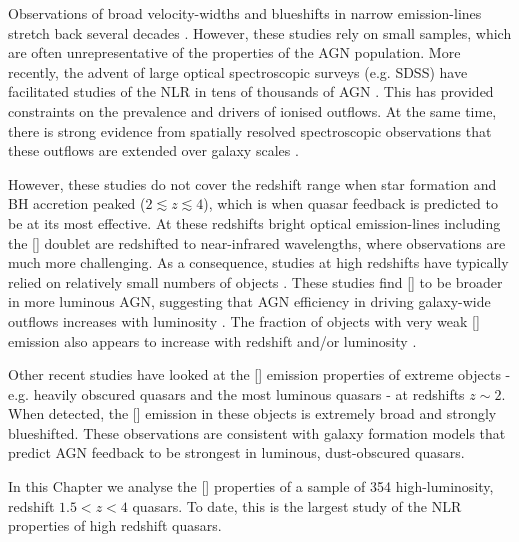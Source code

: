 Observations of broad velocity-widths and blueshifts in narrow emission-lines stretch back several decades \citep[e.g.][]{weedman70,stockton76,heckman81,veron81,feldman82,heckman84,vrtilek85,whittle85,boroson92}. 
However, these studies rely on small samples, which are often unrepresentative of the properties of the AGN population. 
More recently, the advent of large optical spectroscopic surveys (e.g. SDSS) have facilitated studies of the NLR in tens of thousands of AGN \citep[e.g.][]{boroson05,greene05a,zhang11,mullaney13,zakamska14,shen14}. 
This has provided constraints on the prevalence and drivers of ionised outflows.   
At the same time, there is strong evidence from spatially resolved spectroscopic observations that these outflows are extended over galaxy scales \citep[e.g.][]{greene09,greene11,hainline13,harrison12,harrison14}. 

However, these studies do not cover the redshift range when star formation and BH accretion peaked ($2 \lesssim z \lesssim 4$), which is when quasar feedback is predicted to be at its most effective.  
At these redshifts bright optical emission-lines including the [] doublet are redshifted to near-infrared wavelengths, where observations are much more challenging. 
As a consequence, studies at high redshifts have typically relied on relatively small numbers of objects \citep[e.g.][]{netzer04,sulentic04,shen16a}.
These studies find [] to be broader in more luminous AGN, suggesting that AGN efficiency in driving galaxy-wide outflows increases with luminosity \citep[e.g.][]{netzer04,nesvadba08,kim13,brusa15,carniani15,perna15,bischetti16}. 
The fraction of objects with very weak [] emission also appears to increase with redshift and/or luminosity \citep[e.g.][]{netzer04}. 

Other recent studies have looked at the [] emission properties of extreme objects - e.g. heavily obscured quasars \citep{zakamska16} and the most luminous quasars \citep{bischetti16} - at redshifts $z\sim2$. 
When detected, the [] emission in these objects is extremely broad and strongly blueshifted. 
These observations are consistent with galaxy formation models that predict AGN feedback to be strongest in luminous, dust-obscured quasars.

In this Chapter we analyse the [] properties of a sample of 354 high-luminosity, redshift $1.5 < z < 4$ quasars.
To date, this is the largest study of the NLR properties of high redshift quasars. 

